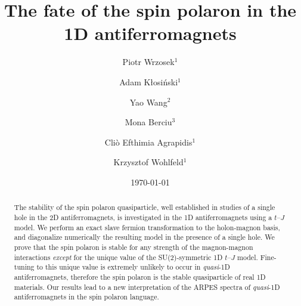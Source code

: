 \documentclass[%
 reprint,
 amsmath,amssymb,
 aps,
prl,
]{revtex4-1}
\begin{document}

\title{
The fate of the spin polaron in the 1D antiferromagnets
}

\author{Piotr Wrzosek$^1$}
\author{Adam K\l{}osi\'nski$^1$}
\author{Yao Wang$^2$}
\author{Mona Berciu$^3$}
\author{Cli\`o Efthimia Agrapidis$^1$}
\author{Krzysztof Wohlfeld$^1$}
 
%

%

%

\date{\today}%

\begin{abstract}
The stability of the spin polaron quasiparticle, well established in studies of a single hole in the 2D antiferromagnets, is investigated in the 1D antiferromagnets using a $t$--$J$ model. We  perform an exact slave fermion transformation to the holon-magnon basis, and  diagonalize numerically the resulting model in the presence of a single hole. We prove that the spin polaron is stable for any strength of the magnon-magnon interactions {\it except} for the unique value of the SU(2)-symmetric 1D $t$--$J$ model. Fine-tuning to this unique value is extremely unlikely to occur in {\it quasi}-1D antiferromagnets, therefore the spin polaron is the stable quasiparticle of real 1D materials. Our results lead to a new interpretation of the ARPES spectra of {\it quasi}-1D antiferromagnets in the spin polaron language.
%
\end{abstract}

\maketitle


\def\L{28}
\end{document}
